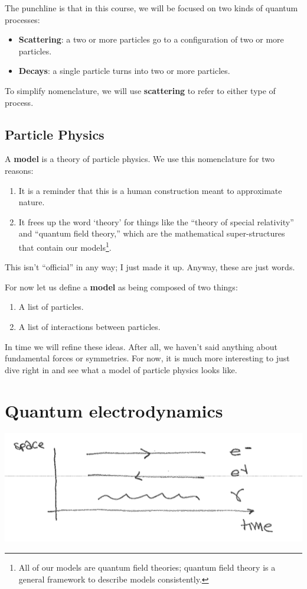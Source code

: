 \documentclass[12pt]{article}
\numberwithin{equation}{section}    %
\begin{document}
The punchline is that in this course, we will be focused on two kinds of quantum processes:
\begin{itemize}
	\item \textbf{Scattering}: a two or more particles go to a configuration of two or more particles.
	\item \textbf{Decays}: a single particle turns into two or more particles.
\end{itemize}
To simplify nomenclature, we will use \textbf{scattering} to refer to either type of process.


\subsection{Particle Physics}

A \textbf{model} is a theory of particle physics. We use this nomenclature for two reasons:
\begin{enumerate}
	\item It is a reminder that this is a human construction meant to approximate nature.
	\item It frees up the word `theory' for things like the ``theory of special relativity'' and ``quantum field theory,'' which are the mathematical super-structures that contain our models\footnote{All of our models are quantum field theories; quantum field theory is a general framework to describe models consistently.}.
\end{enumerate}
This isn't ``official'' in any way; I just made it up. Anyway, these are just words. 

For now let us define a \textbf{model} as being composed of two things:
\begin{enumerate}
	\item A list of particles.
	\item A list of interactions between particles. 
\end{enumerate}
In time we will refine these ideas. After all, we haven't said anything about fundamental forces or symmetries. For now, it is much more interesting to just dive right in and see what a model of particle physics looks like.

\section{Quantum electrodynamics}

\includegraphics[width=\textwidth]{Lec1_forward}
\end{document}

